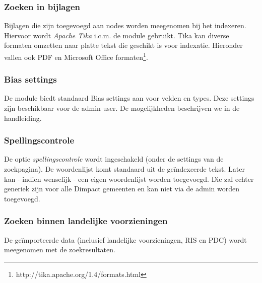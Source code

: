 \subsubsection{Zoeken in bijlagen}
Bijlagen die zijn toegevoegd aan nodes worden meegenomen bij het indexeren. Hiervoor wordt \emph{Apache Tika} i.c.m. de  module gebruikt. Tika kan diverse formaten omzetten naar platte tekst die geschikt is voor indexatie. Hieronder vallen ook PDF en Microsoft Office formaten\footnote{http://tika.apache.org/1.4/formats.html}.

\subsubsection{Bias settings}
De  module biedt standaard Bias settings aan voor velden en types. Deze settings zijn beschikbaar voor de admin user. De mogelijkheden beschrijven we in de handleiding.

\subsubsection{Spellingscontrole}
De optie \emph{spellingscontrole} wordt ingeschakeld (onder de settings van de zoekpagina). De woordenlijst komt standaard uit de ge\"{i}ndexeerde tekst. Later kan - indien wenselijk - een eigen woordenlijst worden toegevoegd. Die zal echter generiek zijn voor alle Dimpact gemeenten en kan niet via de admin worden toegevoegd.

\subsubsection{Zoeken binnen landelijke voorzieningen}
De ge\"{i}mporteerde data (inclusief landelijke voorzieningen, RIS en PDC) wordt meegenomen met de zoekresultaten. 

